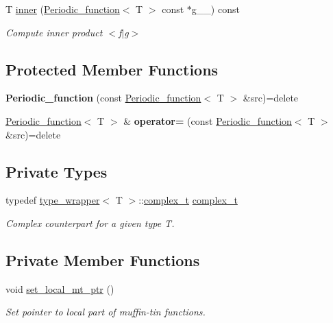 \begin{DoxyCompactItemize}
\item 
T \hyperlink{classsirius_1_1_periodic__function_aa4db4aaaf637a4e6d225e66389034980}{inner} (\hyperlink{classsirius_1_1_periodic__function}{Periodic\+\_\+function}$<$ T $>$ const $\ast$g\+\_\+\+\_\+) const 
\begin{DoxyCompactList}\small\item\em Compute inner product $<$f$\vert$g$>$ \end{DoxyCompactList}\end{DoxyCompactItemize}
\subsection*{Protected Member Functions}
\begin{DoxyCompactItemize}
\item 
\hypertarget{classsirius_1_1_periodic__function_a65fafecaa0ce89b8be29c028a7cbdfcd}{}{\bfseries Periodic\+\_\+function} (const \hyperlink{classsirius_1_1_periodic__function}{Periodic\+\_\+function}$<$ T $>$ \&src)=delete\label{classsirius_1_1_periodic__function_a65fafecaa0ce89b8be29c028a7cbdfcd}

\item 
\hypertarget{classsirius_1_1_periodic__function_a40de62db6e9cfa3efaadb4355ff3b5d4}{}\hyperlink{classsirius_1_1_periodic__function}{Periodic\+\_\+function}$<$ T $>$ \& {\bfseries operator=} (const \hyperlink{classsirius_1_1_periodic__function}{Periodic\+\_\+function}$<$ T $>$ \&src)=delete\label{classsirius_1_1_periodic__function_a40de62db6e9cfa3efaadb4355ff3b5d4}

\end{DoxyCompactItemize}
\subsection*{Private Types}
\begin{DoxyCompactItemize}
\item 
typedef \hyperlink{classtype__wrapper}{type\+\_\+wrapper}$<$ T $>$\+::\hyperlink{classsirius_1_1_periodic__function_ab8dd7265e22b9321a85d3d63c3874918}{complex\+\_\+t} \hyperlink{classsirius_1_1_periodic__function_ab8dd7265e22b9321a85d3d63c3874918}{complex\+\_\+t}
\begin{DoxyCompactList}\small\item\em Complex counterpart for a given type T. \end{DoxyCompactList}\end{DoxyCompactItemize}
\subsection*{Private Member Functions}
\begin{DoxyCompactItemize}
\item 
void \hyperlink{classsirius_1_1_periodic__function_ab81901dff93665a114a6d936fe1f5941}{set\+\_\+local\+\_\+mt\+\_\+ptr} ()
\begin{DoxyCompactList}\small\item\em Set pointer to local part of muffin-\/tin functions. \end{DoxyCompactList}\end{DoxyCompactItemize}
